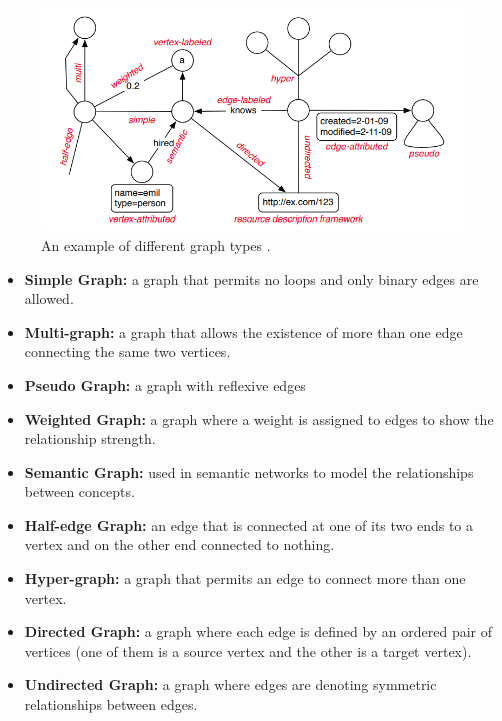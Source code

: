 {\begin{figure}
\centering
\includegraphics[width=17cm]{pics/graph-types.png}
\caption{An example of different graph types \cite{DBLP:journals/corr/abs-1006-2361}.}
\label{fig_graph-types}
\end{figure} 

\begin{itemize}  
\item \textbf{Simple Graph:} a graph that permits no loops and only binary edges are allowed.

\item \textbf{Multi-graph:} a graph that allows the existence of more than one edge connecting the same two vertices.

\item \textbf{Pseudo Graph:} a graph with reflexive edges

\item \textbf{Weighted Graph:} a graph where a weight is assigned to edges to show the relationship strength.

\item \textbf{Semantic Graph:} used in semantic networks to model the relationships between concepts.

\item \textbf{Half-edge Graph:} an edge that is connected at one of its two ends to a vertex and on the other end connected to nothing.

\item \textbf{Hyper-graph:} a graph that permits an edge to connect more than one vertex.

\item \textbf{Directed Graph:} a graph where each edge is defined by an ordered pair of vertices (one of them is a source vertex and the other is a target vertex).

\item \textbf{Undirected Graph:} a graph where edges are denoting symmetric relationships between edges.


\end{itemize}}
